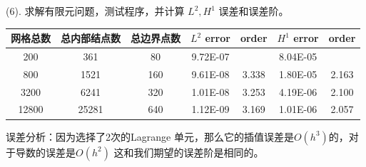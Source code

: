 \documentclass[11pt]{ctexart}
\begin{document}
(6). 求解有限元问题，测试程序，并计算 $ L^2,H^1 $ 误差和误差阶。
\begin{table}[htbp]
  \centering
  \begin{tabular}{|c|c|c|cc|cc|}
    \toprule
    网格总数 & 总内部结点数 & 总边界点数& \multicolumn{1}{c}{$L^2$ error} & \multicolumn{1}{c|}{order} & \multicolumn{1}{c}{$H^1$ error} & \multicolumn{1}{c|}{order} \\
    \midrule
    200 & 361 & 80     & 9.72E-07 &       & 8.04E-05 &       \\
    800 & 1521 & 160   & 9.61E-08 & 3.338 & 1.80E-05 & 2.163 \\
    3200 & 6241 & 320  & 1.01E-08 & 3.253 & 4.19E-06 & 2.100 \\
    12800& 25281 & 640 & 1.12E-09 & 3.169 & 1.01E-06 & 2.057 \\
    \bottomrule
  \end{tabular}%
  \label{tab:error}%
\end{table}%

误差分析：因为选择了2次的Lagrange 单元，那么它的插值误差是$O(h^3)$的，对于导数的误差是$O(h^2)$ 这和我们期望的误差阶是相同的。
\end{document}
